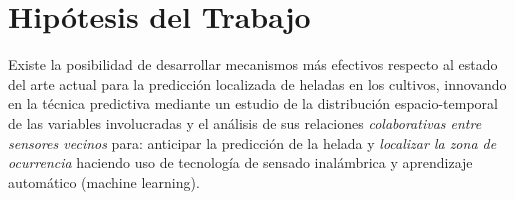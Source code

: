 \documentclass[final,a4paper]{llncs}
\begin{document}

% 
%

\section{Hipótesis del Trabajo}

Existe la posibilidad de desarrollar mecanismos más efectivos respecto al estado del 
arte actual para la predicción localizada de heladas en los cultivos, innovando en la
técnica predictiva mediante un estudio de la distribución espacio-temporal de las 
variables involucradas y el análisis de sus relaciones 
\textit{colaborativas entre sensores vecinos} para: anticipar 
la predicción de la helada y \textit{localizar la zona de ocurrencia} haciendo uso de 
tecnología de sensado inalámbrica y aprendizaje automático (machine learning).
\end{document}
